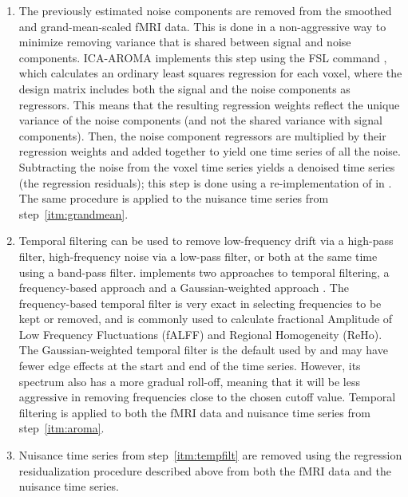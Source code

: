 \begin{enumerate}[leftmargin=*]
\item\label{itm:aroma}

The previously estimated  noise components are removed from
the smoothed and grand-mean-scaled fMRI data. This is done in a
non-aggressive way to minimize removing variance that is shared between
signal and noise components. ICA-AROMA implements this step using the FSL
command , which calculates an ordinary least squares
regression for each voxel, where the design matrix includes both the signal
and the noise components as regressors. This means that the resulting
regression weights reflect the unique variance of the noise components (and
not the shared variance with signal components). Then, the noise component
regressors are multiplied by their regression weights and added together to
yield one time series of all the noise. Subtracting the noise from the
voxel time series yields a denoised time series (the regression residuals);
this step is done using a re-implementation of  in
 \citep{10.1038/s41586-020-2649-2}. The same procedure is
applied to the nuisance time series from step~\ref{itm:grandmean}.

\item\label{itm:tempfilt}

Temporal filtering can be used to remove low-frequency drift via a
high-pass filter, high-frequency noise via a low-pass filter, or both at
the same time using a band-pass filter.  implements two
approaches to temporal filtering, a frequency-based approach
\citep{10.1155/2013/935154} and a Gaussian-weighted approach
\citep{10.1006/nimg.2000.0628}. The frequency-based temporal filter is very
exact in selecting frequencies to be kept or removed, and is commonly used
to calculate fractional Amplitude of Low Frequency Fluctuations (fALFF) and
Regional Homogeneity (ReHo). The Gaussian-weighted temporal filter is the
default used by  \citep{10.1016/j.neuroimage.2011.09.015}
and may have fewer edge effects at the start and end of the time series.
However, its spectrum also has a more gradual roll-off, meaning that it
will be less aggressive in removing frequencies close to the chosen cutoff
value. Temporal filtering is applied to both the fMRI data and nuisance
time series from step~\ref{itm:aroma}.

\item

Nuisance time series from step~\ref{itm:tempfilt} are removed using the
regression residualization procedure described above from both the fMRI
data and the nuisance time series.

\end{enumerate}

